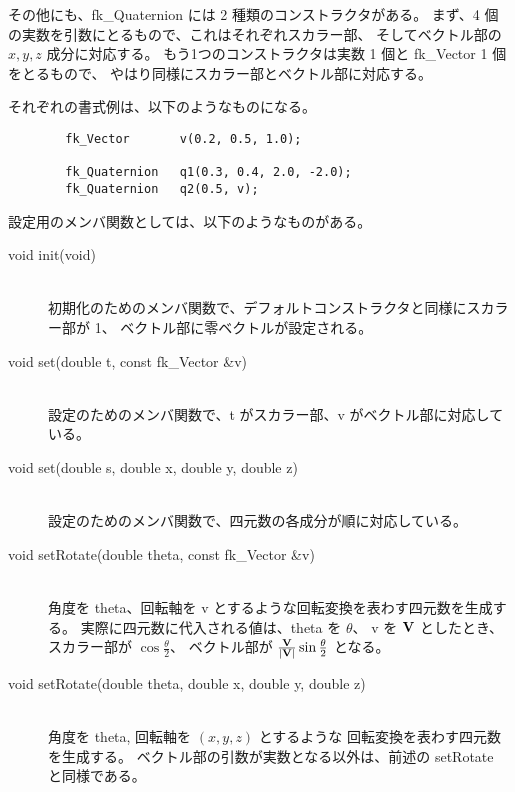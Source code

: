 その他にも、fk\_Quaternion には 2 種類のコンストラクタがある。
まず、4 個の実数を引数にとるもので、これはそれぞれスカラー部、
そしてベクトル部の \(x, y, z\) 成分に対応する。
もう1つのコンストラクタは実数 1 個と fk\_Vector 1 個をとるもので、
やはり同様にスカラー部とベクトル部に対応する。

それぞれの書式例は、以下のようなものになる。
\\
\begin{screen}
\begin{verbatim}
        fk_Vector       v(0.2, 0.5, 1.0);

        fk_Quaternion   q1(0.3, 0.4, 2.0, -2.0);
        fk_Quaternion   q2(0.5, v);
\end{verbatim}
\end{screen}

設定用のメンバ関数としては、以下のようなものがある。

\begin{description}
\item[void init(void)] ~ \\
初期化のためのメンバ関数で、デフォルトコンストラクタと同様にスカラー部が 1、
ベクトル部に零ベクトルが設定される。\\

\item[void set(double t, const fk\_Vector \&v)] ~ \\
設定のためのメンバ関数で、t がスカラー部、v がベクトル部に対応している。\\

\item[void set(double s, double x, double y, double z)] ~ \\
設定のためのメンバ関数で、四元数の各成分が順に対応している。\\

\item[void setRotate(double theta, const fk\_Vector \&v)] ~ \\
角度を theta、回転軸を v とするような回転変換を表わす四元数を生成する。
実際に四元数に代入される値は、theta を \(\theta\)、
v を \(\mathbf{V}\) としたとき、
スカラー部が \(\cos\frac{\theta}{2}\)、
ベクトル部が \(\frac{\mathbf{V}}{|\mathbf{V}|}\sin\frac{\theta}{2}\) となる。\\

\item[void setRotate(double theta, double x, double y, double z)] ~ \\
角度を theta, 回転軸を \((x, y, z)\) とするような
回転変換を表わす四元数を生成する。
ベクトル部の引数が実数となる以外は、前述の setRotate と同様である。
\end{description}

